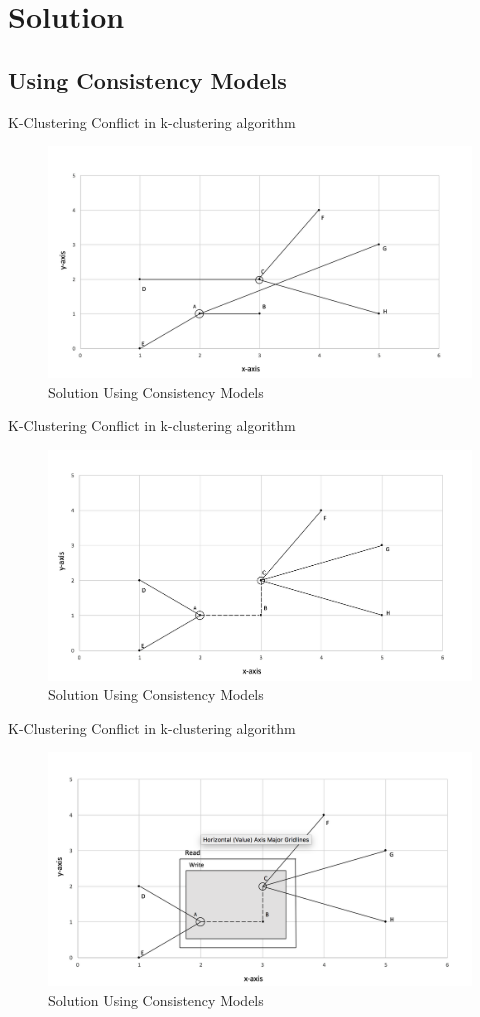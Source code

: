 \section{Solution}
\subsection{Using Consistency Models}
\begin{frame}{K-Clustering}
	Conflict in k-clustering algorithm
			\begin{figure}
			\includegraphics[width=0.8\linewidth]{figures/kcluster1.jpg}
			\caption{Solution Using Consistency Models}
			\end{figure}
\end{frame}

\begin{frame}{K-Clustering}
	Conflict in k-clustering algorithm
			\begin{figure}
			\includegraphics[width=0.8\linewidth]{figures/kcluster2.jpg}
			\caption{Solution Using Consistency Models}
			\end{figure}
\end{frame}

\begin{frame}{K-Clustering}
	Conflict in k-clustering algorithm
			\begin{figure}
			\includegraphics[width=0.8\linewidth]{figures/kcluster3.png}
			\caption{Solution Using Consistency Models}
			\end{figure}
\end{frame}



